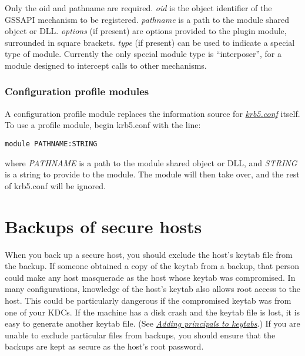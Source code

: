 \documentclass[letterpaper,10pt,english]{sphinxmanual}
\begin{document}
Only the oid and pathname are required.  \emph{oid} is the object
identifier of the GSSAPI mechanism to be registered.  \emph{pathname} is a
path to the module shared object or DLL.  \emph{options} (if present) are
options provided to the plugin module, surrounded in square brackets.
\emph{type} (if present) can be used to indicate a special type of module.
Currently the only special module type is ``interposer'', for a module
designed to intercept calls to other mechanisms.


\subsection{Configuration profile modules}
\label{admin/host_config:profile-plugin-config}\label{admin/host_config:configuration-profile-modules}
A configuration profile module replaces the information source for
{\hyperref[admin/conf_files/krb5_conf:krb5-conf-5]{\emph{krb5.conf}}} itself.  To use a profile module, begin krb5.conf
with the line:

\begin{Verbatim}[commandchars=\\\{\}]
module PATHNAME:STRING
\end{Verbatim}

where \emph{PATHNAME} is a path to the module shared object or DLL, and
\emph{STRING} is a string to provide to the module.  The module will then
take over, and the rest of krb5.conf will be ignored.


\chapter{Backups of secure hosts}
\label{admin/backup_host:backups-of-secure-hosts}\label{admin/backup_host::doc}
When you back up a secure host, you should exclude the host's keytab
file from the backup.  If someone obtained a copy of the keytab from a
backup, that person could make any host masquerade as the host whose
keytab was compromised.  In many configurations, knowledge of the
host's keytab also allows root access to the host.  This could be
particularly dangerous if the compromised keytab was from one of your
KDCs.  If the machine has a disk crash and the keytab file is lost, it
is easy to generate another keytab file.  (See {\hyperref[admin/appl_servers:add-princ-kt]{\emph{Adding principals to keytabs}}}.)
If you are unable to exclude particular files from backups, you should
ensure that the backups are kept as secure as the host's root
password.
\end{document}
